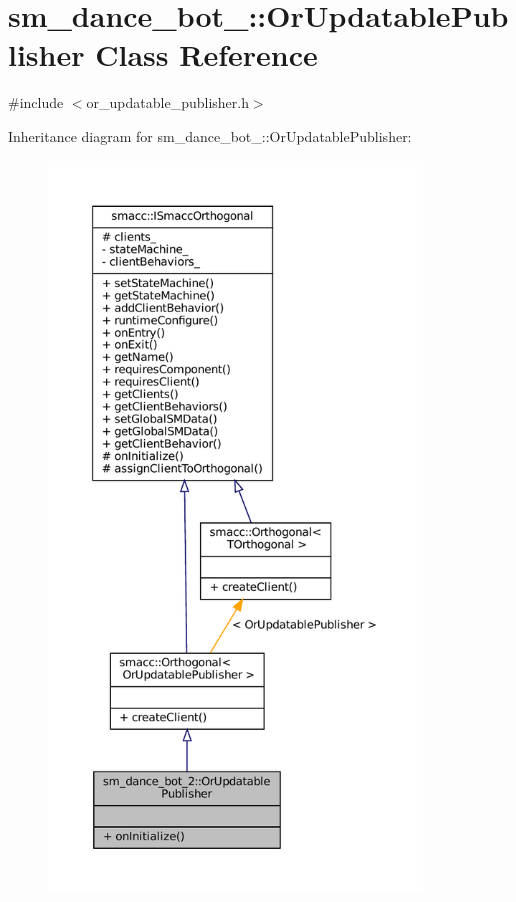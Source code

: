 \hypertarget{classsm__dance__bot__2_1_1OrUpdatablePublisher}{}\section{sm\+\_\+dance\+\_\+bot\+\_\+:\+:Or\+Updatable\+Publisher Class Reference}
\label{classsm__dance__bot__2_1_1OrUpdatablePublisher}


{\ttfamily \#include $<$or\+\_\+updatable\+\_\+publisher.\+h$>$}



Inheritance diagram for sm\+\_\+dance\+\_\+bot\+\_\+:\+:Or\+Updatable\+Publisher\+:
\nopagebreak
\begin{figure}[H]
\begin{center}
\leavevmode
\includegraphics[height=550pt]{classsm__dance__bot__2_1_1OrUpdatablePublisher__inherit__graph}
\end{center}
\end{figure}


